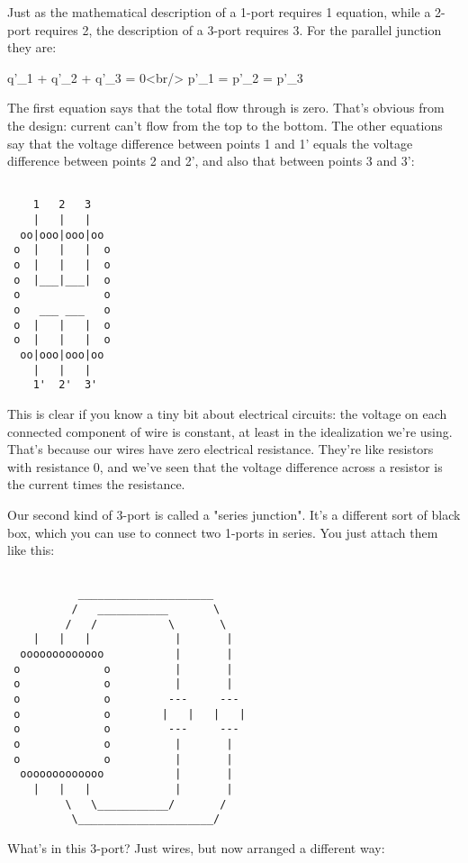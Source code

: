 Just as the mathematical description of a 1-port requires 1 equation,
while a 2-port requires 2, the description of a 3-port requires 3.
For the parallel junction they are:

  q'_{1} + q'_{2} + q'_{3} = 0<br/>
  p'_{1} = p'_{2} = p'_{3}

The first equation says that the total flow through is zero.  That's
obvious from the design: current can't flow from the top to the
bottom.  The other equations say that the voltage difference between
points 1 and 1' equals the voltage difference between points 2 and 2',
and also that between points 3 and 3':


\begin{verbatim}

    1   2   3
    |   |   |
  oo|ooo|ooo|oo
 o  |   |   |  o
 o  |   |   |  o
 o  |___|___|  o
 o             o
 o   ___ ___   o
 o  |   |   |  o
 o  |   |   |  o
  oo|ooo|ooo|oo
    |   |   |
    1'  2'  3'

\end{verbatim}
    
This is clear if you know a tiny bit about electrical circuits:
the voltage on each connected component of wire is constant, at
least in the idealization we're using.  That's because our wires
have zero electrical resistance.  They're like resistors with 
resistance 0, and we've seen that the voltage difference across
a resistor is the current times the resistance.  

Our second kind of 3-port is called a "series junction".  It's a
different sort of black box, which you can use to connect two 1-ports
in series.  You just attach them like this:


\begin{verbatim}

           _____________________
          /   ___________       \
         /   /           \       \
    |   |   |             |       |
  ooooooooooooo           |       |
 o             o          |       |
 o             o          |       |
 o             o         ---     ---
 o             o        |   |   |   |
 o             o         ---     ---
 o             o          |       |
 o             o          |       |
  ooooooooooooo           |       |
    |   |   |             |       |
         \   \___________/       /  
          \_____________________/    
\end{verbatim}
    

What's in this 3-port?  Just wires, but now arranged a different way:



